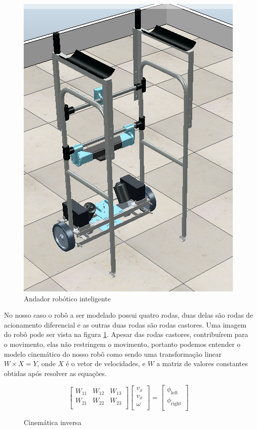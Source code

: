 \begin{figure}[H]
    \centering
    \includegraphics[scale=0.4]{figuras/smart_walker.png}
    \caption{Andador robótico inteligente}
    \label{fig:andador:robotico:inteligente}
\end{figure}


No nosso caso o robô a ser modelado possui quatro rodas, duas delas são
rodas de acionamento diferencial e as outras duas rodas são rodas castores.
Uma imagem do robô pode ser vista na figura \ref{fig:andador:robotico:inteligente}.
Apesar das rodas castores, contribuírem para o movimento, elas não restringem
o movimento, portanto podemos entender o modelo cinemático do nosso robô
como sendo uma transformação linear $W \times X = Y$, onde $X$ é o vetor
de velocidades, e $W$ a matriz de valores constantes obtidas após resolver
as equações.

\begin{figure}[H]
    \[
    \begin{bmatrix}
        W_{11} &  W_{12} & W_{13} \\
        W_{21} &  W_{22} & W_{23} \\
    \end{bmatrix}
    \begin{bmatrix}
        v_x \\
        v_x \\
        \omega \\
    \end{bmatrix}
    =
    \begin{bmatrix}
        \phi_{\text{left}} \\
        \phi_{\text{right}} \\
    \end{bmatrix}
\]
    \caption{Cinemática inversa}
\end{figure}

